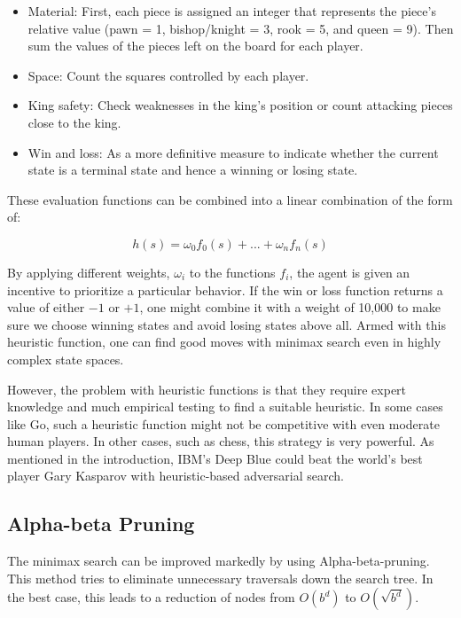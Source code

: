 \begin{itemize}
    \item Material: First, each piece is assigned an integer that represents the piece's relative value (pawn = 1, bishop/knight = 3, rook = 5, and queen = 9). Then sum the values of the pieces left on the board for each player.
    \item Space: Count the squares controlled by each player.
    \item King safety: Check weaknesses in the king's position or count attacking pieces close to the king.
    \item Win and loss: As a more definitive measure to indicate whether the current state is a terminal state and hence a winning or losing state.
\end{itemize}

These evaluation functions can be combined into a linear combination of the form of:

\begin{equation}
    h(s) = \omega_0f_0(s) + ... + \omega_nf_n(s)
\end{equation}

By applying different weights, $ \omega_i $ to the functions $ f_i $, the agent is given an incentive to prioritize a particular behavior. If the win or loss function returns a value of either $-1$ or $+1$, one might combine it with a weight of 10,000 to make sure we choose winning states and avoid losing states above all. Armed with this heuristic function, one can find good moves with minimax search even in highly complex state spaces.

However, the problem with heuristic functions is that they require expert knowledge and much empirical testing to find a suitable heuristic. In some cases like Go, such a heuristic function might not be competitive with even moderate human players. In other cases, such as chess, this strategy is very powerful. As mentioned in the introduction, IBM's Deep Blue could beat the world's best player Gary Kasparov with heuristic-based adversarial search.

\subsection{Alpha-beta Pruning}
The minimax search can be improved markedly by using Alpha-beta-pruning. This method tries to eliminate unnecessary traversals down the search tree. In the best case, this leads to a reduction of nodes from $ O(b^d) $ to $ O(\sqrt{b^d}) $.

